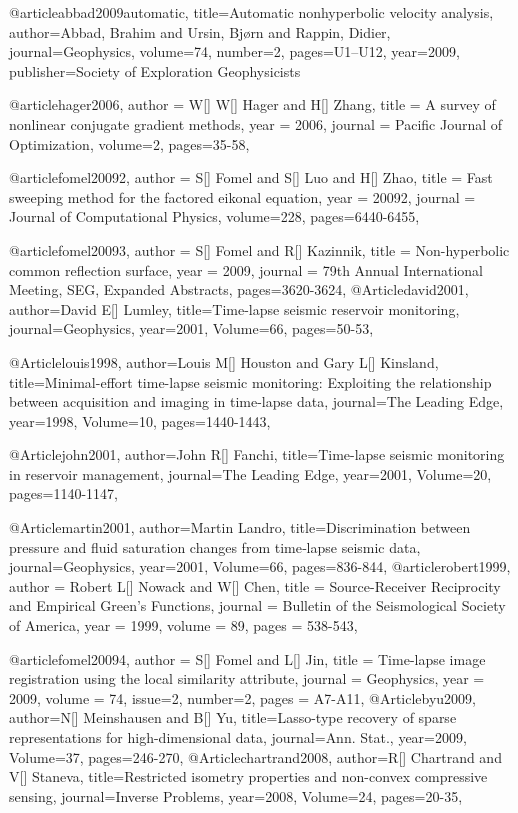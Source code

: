 @article{abbad2009automatic,
  title={Automatic nonhyperbolic velocity analysis},
  author={Abbad, Brahim and Ursin, Bj{\o}rn and Rappin, Didier},
  journal={Geophysics},
  volume={74},
  number={2},
  pages={U1--U12},
  year={2009},
  publisher={Society of Exploration Geophysicists}
}

@article{hager2006,
  author =	 {W[] W[] Hager and H[] Zhang},
  title =	 {A survey of nonlinear conjugate gradient methods},
  year =	 2006,
  journal =	 {Pacific Journal of Optimization},
  volume={2},
 pages=35-58,
}

@article{fomel20092,
  author =	 {S[] Fomel and S[] Luo and H[] Zhao},
  title =	 {Fast sweeping method for the factored eikonal equation},
  year =	 20092,
  journal =	 {Journal of Computational Physics},
  volume={228},
 pages=6440-6455,
}

@article{fomel20093,
  author =	 {S[] Fomel and R[] Kazinnik},
  title =	 {Non-hyperbolic common reflection surface},
  year =	 2009,
  journal =	 {79th Annual International Meeting, SEG, Expanded Abstracts},
 pages=3620-3624,
}
@Article{david2001,
  author={David E[] Lumley},
  title={Time-lapse seismic reservoir monitoring},
  journal={Geophysics},
  year=2001,
  Volume=66,
  pages={50-53},
}

@Article{louis1998,
  author={Louis M[] Houston and Gary L[] Kinsland},
  title={Minimal-effort time-lapse seismic monitoring: Exploiting the relationship between acquisition and imaging in time-lapse data},
  journal={The Leading Edge},
  year=1998,
  Volume=10,
  pages={1440-1443},
}

@Article{john2001,
  author={John R[] Fanchi},
  title={Time-lapse seismic monitoring in reservoir management},
  journal={The Leading Edge},
  year=2001,
  Volume=20,
  pages={1140-1147},
}

@Article{martin2001,
  author={Martin Landro},
  title={Discrimination between pressure and fluid saturation changes from time‐lapse seismic data},
  journal={Geophysics},
  year=2001,
  Volume=66,
  pages={836-844},
}
@article{robert1999,
  author =	 {Robert L[] Nowack and W[] Chen},
  title =	 {Source-Receiver Reciprocity and Empirical {G}reen's Functions},
  journal = 	 {Bulletin of the Seismological Society of America},
  year = 	 1999,
  volume =	 89,
  pages =	 {538-543},
}

@article{fomel20094,
  author =	 {S[] Fomel and L[] Jin},
  title =	 {Time-lapse image registration using the local similarity attribute},
  journal = 	 {Geophysics},
  year = 	 2009,
  volume =	 74,
  issue=2,
  number=2,
  pages =	 {A7-A11},
}
@Article{byu2009,
  author={N[] Meinshausen and B[] Yu},
  title={Lasso-type recovery of sparse representations for high-dimensional data},
  journal={Ann. Stat.},
  year=2009,
  Volume=37,
  pages={246-270},
}
@Article{chartrand2008,
  author={R[] Chartrand and V[] Staneva},
  title={Restricted isometry properties and non-convex compressive sensing},
  journal={Inverse Problems},
  year=2008,
  Volume=24,
  pages={20-35},
}

